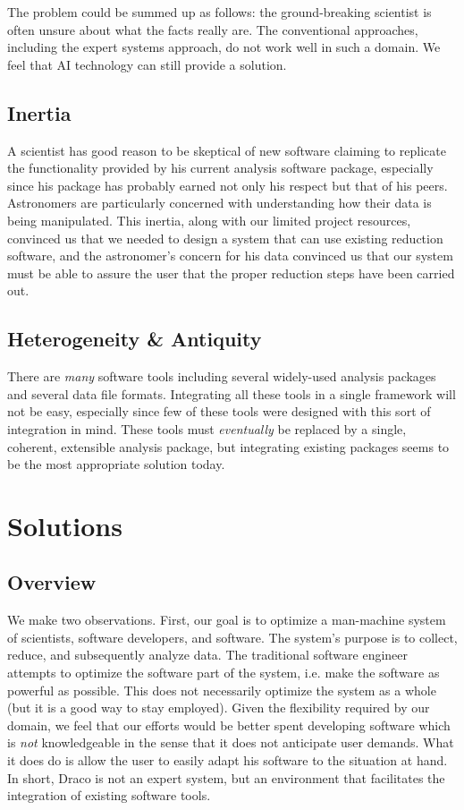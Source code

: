 The problem could be summed up as follows: the ground-breaking scientist is
often unsure about what the facts really are.  The conventional approaches,
including the expert systems approach, do not work well in such a domain.
We feel that AI technology can still provide a solution.

\subsection{Inertia}
A scientist has good reason to be skeptical of new software claiming to
replicate the functionality provided by his current analysis software package,
especially since his package has probably earned not only his respect but that
of his peers.  Astronomers are particularly concerned with understanding how
their data is being manipulated.  This inertia, along with our limited project
resources, convinced us that we needed to design a system that can use existing
reduction software, and the astronomer's concern for his data convinced us that
our system must be able to assure the user that the proper reduction steps have
been carried out.

\subsection{Heterogeneity \& Antiquity}
There are {\it many} software tools including several widely-used analysis
packages and several data file formats.  Integrating all these tools in a
single framework will not be easy, especially since few of these tools were
designed with this sort of integration in mind.  These tools must
{\it eventually} be replaced by a single, coherent, extensible analysis
package, but integrating existing packages seems to be the most appropriate
solution today.

\section{Solutions}

\subsection{Overview}

We make two observations.  First, our goal is to optimize a man-machine system
of scientists, software developers, and software.  The system's purpose is to
collect, reduce, and subsequently analyze data.  The traditional software
engineer attempts to optimize the software part of the system, i.e. make the
software as powerful as possible.  This does not necessarily optimize the
system as a whole (but it is a good way to stay employed).  Given the
flexibility required by our domain, we feel that our efforts would be better
spent developing software which is {\it not} knowledgeable in the sense that
it does not anticipate user demands.  What it does do is allow the user to
easily adapt his software to the situation at hand.  In short, Draco is not
an expert system, but an environment that facilitates the integration of
existing software tools.

